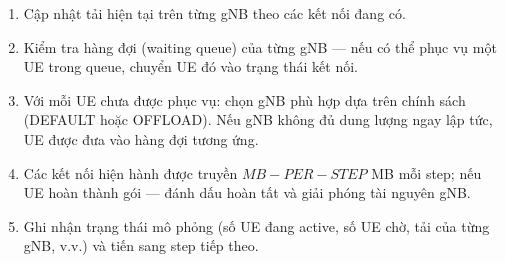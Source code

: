 \begin{enumerate}
\item Cập nhật tải hiện tại trên từng gNB theo các kết nối đang có.
\item Kiểm tra hàng đợi (waiting queue) của từng gNB — nếu có thể phục vụ một UE trong queue, chuyển UE đó vào trạng thái kết nối.
\item Với mỗi UE chưa được phục vụ: chọn gNB phù hợp dựa trên chính sách (DEFAULT hoặc OFFLOAD). Nếu gNB không đủ dung lượng ngay lập tức, UE được đưa vào hàng đợi tương ứng.
\item Các kết nối hiện hành được truyền $MB-PER-STEP$ MB mỗi step; nếu UE hoàn thành gói — đánh dấu hoàn tất và giải phóng tài nguyên gNB.
\item Ghi nhận trạng thái mô phỏng (số UE đang active, số UE chờ, tải của từng gNB, v.v.) và tiến sang step tiếp theo.
\end{enumerate}